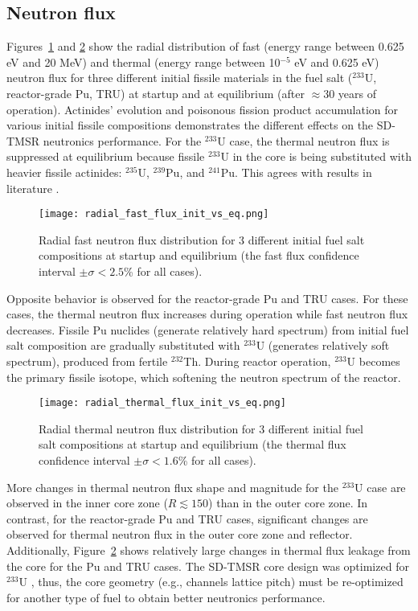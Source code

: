\subsection{Neutron flux}
Figures~\ref{fig:fast_flux} and \ref{fig:thermal_flux} show the radial 
distribution of fast (energy range between 0.625 eV and 20 MeV) and thermal 
(energy range between 10$^{-5}$ eV and 0.625 eV) neutron flux for three 
different initial fissile materials in the fuel salt ($^{233}$U, reactor-grade 
Pu, TRU) at startup and at equilibrium (after $\approx 30$ years of 
operation). Actinides' evolution and poisonous fission product accumulation 
for various initial fissile compositions demonstrates the different effects on 
the SD-TMSR neutronics performance. For the $^{233}$U case, the thermal 
neutron flux is suppressed at equilibrium because fissile $^{233}$U in the 
core is being substituted with heavier fissile actinides: $^{235}$U, 
$^{239}$Pu, and $^{241}$Pu. This agrees with results in literature 
\cite{rykhlevskii2019modeling, ashraf2019whole_core}.
\begin{figure}[htp!] %
	\texttt{[image: radial\_fast\_flux\_init\_vs\_eq.png]} 
	\caption{Radial fast neutron flux distribution for 3 different initial 
		fuel salt compositions at startup and equilibrium (the fast flux 
		confidence interval $\pm\sigma<2.5$\% for all cases).}
	\label{fig:fast_flux}
\end{figure}

Opposite behavior is observed for the reactor-grade Pu and TRU cases. For  
these cases, the thermal neutron flux increases during operation while fast 
neutron flux decreases. Fissile Pu nuclides (generate relatively hard 
spectrum) from initial fuel salt composition are gradually substituted with  
$^{233}$U (generates relatively soft spectrum), produced from fertile 
$^{232}$Th. During reactor operation, $^{233}$U becomes the primary fissile 
isotope, which softening the neutron spectrum of the reactor. 
\begin{figure}[htp!] %
	\texttt{[image: radial\_thermal\_flux\_init\_vs\_eq.png]} 
	\caption{Radial thermal neutron flux distribution for 3 different initial 
		fuel salt compositions at startup and equilibrium (the thermal flux 
		confidence interval $\pm\sigma<1.6$\% for all cases).}
	\label{fig:thermal_flux}
\end{figure}

More changes in thermal neutron flux shape and magnitude for the 
$^{233}$U case are observed in the inner core zone ($R\lesssim150$) than 
in the outer core zone. In contrast, for the reactor-grade Pu and TRU cases, 
significant changes are observed for thermal neutron flux in the outer core 
zone and reflector. Additionally, Figure~\ref{fig:thermal_flux} shows 
relatively large changes in thermal flux leakage from the core for the Pu and 
TRU cases. The SD-TMSR core design was optimized for $^{233}$U  
\cite{li_optimization_2018}, thus, the core geometry (e.g., channels lattice 
pitch) must be re-optimized for another type of fuel to obtain better 
neutronics performance.

